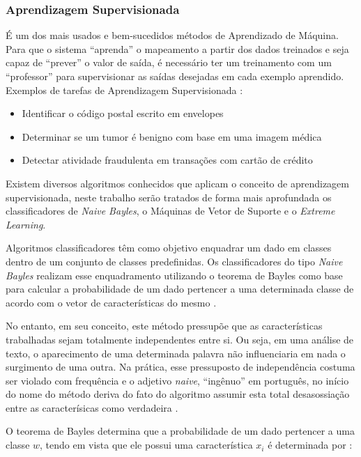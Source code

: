 \documentclass[
	12pt,				%
	openright,			%
	oneside,			%
	a4paper,			%
	english,			%
	spanish,			%
	brazil				%
	]{abntex2}
\begin{document}
	\subsubsection*{Aprendizagem Supervisionada}
		É um dos mais usados e bem-sucedidos métodos de Aprendizado de Máquina. Para que o sistema ``aprenda'' o mapeamento a partir dos dados treinados e seja capaz de ``prever''  o valor de saída, é necessário ter um treinamento com um ``professor'' para supervisionar as saídas desejadas em cada exemplo aprendido. Exemplos de tarefas de Aprendizagem Supervisionada \cite {guido_muller}: 
	\begin{itemize}
	 	\item Identificar o código postal escrito em envelopes
		\item Determinar se um tumor é benigno com base em uma imagem médica
		\item Detectar atividade fraudulenta em transações com cartão de crédito
	\end{itemize}
	
		Existem diversos algoritmos conhecidos que aplicam o conceito de aprendizagem supervisionada, neste trabalho serão tratados de forma mais aprofundada os classificadores de \emph{Naive Bayles}, o Máquinas de Vetor de Suporte e o \emph{Extreme Learning}.
	
	
	Algoritmos classificadores têm como objetivo enquadrar um dado em classes dentro de um conjunto de classes predefinidas. Os classificadores do tipo \emph{Naive Bayles} realizam esse enquadramento utilizando o teorema de Bayles como base para calcular a probabilidade de um dado pertencer a uma determinada classe de acordo com o vetor de características do mesmo \cite{rish}.
	 
	No entanto, em seu conceito, este método pressupõe que as características trabalhadas sejam totalmente independentes entre si. Ou seja, em uma análise de texto, o aparecimento de uma determinada palavra não influenciaria em nada o surgimento de uma outra. Na prática, esse pressuposto de independência costuma ser violado com frequência e o adjetivo \emph{naive}, ``ingênuo'' em português, no início do nome do método deriva do fato do algoritmo assumir esta total desasossiação entre as caracterísicas como verdadeira \cite{raschka}.
		
	O teorema de Bayles determina que a probabilidade de um dado pertencer a uma classe $w$, tendo em vista que ele	possui uma característica $x_i$ é determinada por \cite{raschka}:
	
\end{document}
